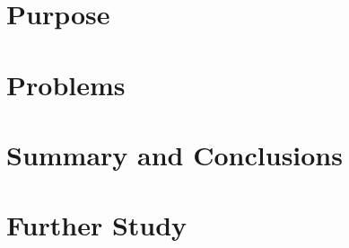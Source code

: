 \documentclass{report}
\begin{document}

\chapter{Purpose}
\chapter{Problems}
\chapter{Summary and Conclusions}
\chapter{Further Study}
\end{document}
